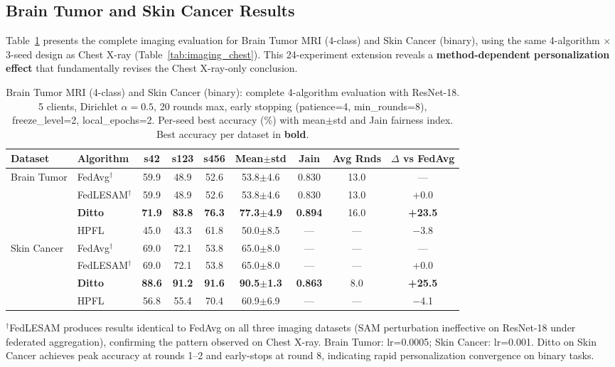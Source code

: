 \documentclass[conference]{IEEEtran}
\begin{document}
\subsection{Brain Tumor and Skin Cancer Results}
\label{sec:imaging_bt_sc}

Table~\ref{tab:imaging_bt_sc_full} presents the complete imaging evaluation for Brain Tumor MRI (4-class) and Skin Cancer (binary), using the same 4-algorithm $\times$ 3-seed design as Chest X-ray (Table~\ref{tab:imaging_chest}). This 24-experiment extension reveals a \textbf{method-dependent personalization effect} that fundamentally revises the Chest X-ray-only conclusion.

\begin{table}[htbp]
\centering
\caption{Brain Tumor MRI (4-class) and Skin Cancer (binary): complete 4-algorithm evaluation with ResNet-18. 5 clients, Dirichlet $\alpha{=}0.5$, 20 rounds max, early stopping (patience=4, min\_rounds=8), freeze\_level=2, local\_epochs=2. Per-seed best accuracy (\%) with mean$\pm$std and Jain fairness index. Best accuracy per dataset in \textbf{bold}.}
\label{tab:imaging_bt_sc_full}
\small
\begin{tabular}{llccccccc}
\toprule
\textbf{Dataset} & \textbf{Algorithm} & \textbf{s42} & \textbf{s123} & \textbf{s456} & \textbf{Mean$\pm$std} & \textbf{Jain} & \textbf{Avg Rnds} & \textbf{$\Delta$ vs FedAvg} \\
\midrule
\multirow{4}{*}{Brain Tumor} & FedAvg$^\dagger$ & 59.9 & 48.9 & 52.6 & 53.8$\pm$4.6 & 0.830 & 13.0 & --- \\
 & FedLESAM$^\dagger$ & 59.9 & 48.9 & 52.6 & 53.8$\pm$4.6 & 0.830 & 13.0 & +0.0 \\
 & \textbf{Ditto} & \textbf{71.9} & \textbf{83.8} & \textbf{76.3} & \textbf{77.3$\pm$4.9} & \textbf{0.894} & 16.0 & \textbf{+23.5} \\
 & HPFL & 45.0 & 43.3 & 61.8 & 50.0$\pm$8.5 & --- & --- & $-$3.8 \\
\midrule
\multirow{4}{*}{Skin Cancer} & FedAvg$^\dagger$ & 69.0 & 72.1 & 53.8 & 65.0$\pm$8.0 & --- & --- & --- \\
 & FedLESAM$^\dagger$ & 69.0 & 72.1 & 53.8 & 65.0$\pm$8.0 & --- & --- & +0.0 \\
 & \textbf{Ditto} & \textbf{88.6} & \textbf{91.2} & \textbf{91.6} & \textbf{90.5$\pm$1.3} & \textbf{0.863} & 8.0 & \textbf{+25.5} \\
 & HPFL & 56.8 & 55.4 & 70.4 & 60.9$\pm$6.9 & --- & --- & $-$4.1 \\
\bottomrule
\end{tabular}
\par{\footnotesize $^\dagger$FedLESAM produces results identical to FedAvg on all three imaging datasets (SAM perturbation ineffective on ResNet-18 under federated aggregation), confirming the pattern observed on Chest X-ray. Brain Tumor: lr=0.0005; Skin Cancer: lr=0.001. Ditto on Skin Cancer achieves peak accuracy at rounds 1--2 and early-stops at round 8, indicating rapid personalization convergence on binary tasks.}
\end{table}
\end{document}
